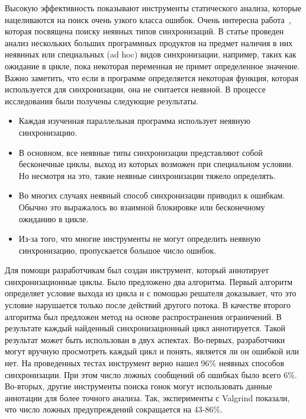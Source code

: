 Высокую эффективность показывают инструменты статического анализа, которые нацеливаются на поиск очень узкого класса ошибок.
Очень интересна работа~\cite{Xiong:2010}, которая посвящена поиску неявных типов синхронизаций.
В статье проведен анализ нескольких больших программных продуктов на предмет наличия в них неявнных или специальных (ad hoc) видов синхронизации, например, таких как ожидание в цикле, пока некоторая переменная не примет определенное значение.
Важно заметить, что если в программе определяется некоторая функция, которая используется для синхронизации, она не считается неявной.
В процессе исследования были получены следующие результаты.

\begin{itemize}
\item Каждая изученная параллельная программа использует неявную синхронизацию.
\item В основном, все неявные типы синхронизации представляют собой бесконечные циклы, выход из которых возможен при специальном условии. Но несмотря на это, такие неявные синхронизации тяжело определять.
\item Во многих случаях неявный способ синхронизации приводил к ошибкам. Обычно это выражалось во взаимной блокировке или бесконечному ожиданию в цикле. 
\item Из-за того, что многие инструменты не могут определить неявную синхронизацию, пропускается большое число ошибок. 
\end{itemize}

Для помощи разработчикам был создан инструмент, который аннотирует синхронизационные циклы.
Было предложено два алгоритма.
Первый алгоритм определяет условие выхода из цикла и с помощью решателя доказывает, что это условие нарушается только после действий другого потока.
В качестве второго алгоритма был предложен метод на основе распространения ограничений.
В результате каждый найденный синхронизационный цикл аннотируется. Такой результат может быть использован в двух аспектах.
Во-первых, разработчики могут вручную просмотреть каждый цикл и понять, является ли он ошибкой или нет.
На проведенных тестах инструмент верно нашел 96\% неявных способов синхронизации. При этом число ложных сообщений об ошибках было всего 6\%.
Во-вторых, другие инструменты поиска гонок могут использовать данные аннотации для более точного анализа.
Так, эксперименты с Valgrind показали, что число ложных предупреждений сокращается на 43-86\%. 

